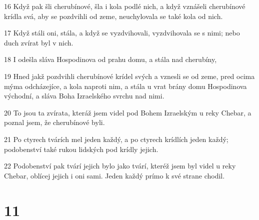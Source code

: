 \par 16 Když pak šli cherubínové, šla i kola podlé nich, a když vznášeli cherubínové krídla svá, aby se pozdvihli od zeme, neuchylovala se také kola od nich.
\par 17 Když stáli oni, stála, a když se vyzdvihovali, vyzdvihovala se s nimi; nebo duch zvírat byl v nich.
\par 18 I odešla sláva Hospodinova od prahu domu, a stála nad cherubíny,
\par 19 Hned jakž pozdvihli cherubínové krídel svých a vznesli se od zeme, pred ocima mýma odcházejíce, a kola naproti nim, a stála u vrat brány domu Hospodinova východní, a sláva Boha Izraelského svrchu nad nimi.
\par 20 To jsou ta zvírata, kteráž jsem videl pod Bohem Izraelským u reky Chebar, a poznal jsem, že cherubínové byli.
\par 21 Po ctyrech tvárích mel jeden každý, a po ctyrech krídlích jeden každý; podobenství také rukou lidských pod krídly jejich.
\par 22 Podobenství pak tvárí jejich bylo jako tvárí, kteréž jsem byl videl u reky Chebar, oblícej jejich i oni sami. Jeden každý prímo k své strane chodil.

\chapter{11}

